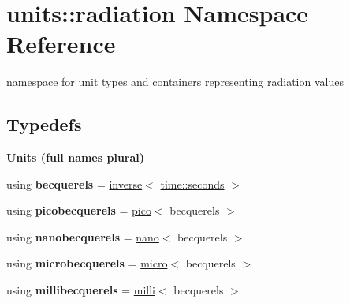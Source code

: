 \hypertarget{namespaceunits_1_1radiation}{}\section{units\+:\+:radiation Namespace Reference}
\label{namespaceunits_1_1radiation}


namespace for unit types and containers representing radiation values  


\subsection*{Typedefs}
\begin{Indent}{\bf Units (full names plural)}\par
\begin{DoxyCompactItemize}
\item 
\hypertarget{namespaceunits_1_1radiation_a44d3bfa167ecb4238de5bf0fad54bd69}{}using {\bfseries becquerels} = \hyperlink{group___unit_manipulators_gaacc539ef162e24b260d023d3ff949b57}{inverse}$<$ \hyperlink{structunits_1_1unit}{time\+::seconds} $>$\label{namespaceunits_1_1radiation_a44d3bfa167ecb4238de5bf0fad54bd69}

\item 
\hypertarget{namespaceunits_1_1radiation_a2d9ad4b0cf2cc17c4226cf0446104c0b}{}using {\bfseries picobecquerels} = \hyperlink{group___unit_manipulators_ga82a8d14a3e0877a375a66b64c45baab9}{pico}$<$ becquerels $>$\label{namespaceunits_1_1radiation_a2d9ad4b0cf2cc17c4226cf0446104c0b}

\item 
\hypertarget{namespaceunits_1_1radiation_a223740f0a2fec16ea89c6a9df7fb4144}{}using {\bfseries nanobecquerels} = \hyperlink{group___unit_manipulators_ga1c25c3c1d6c1f3aed3fd1ecf043110d5}{nano}$<$ becquerels $>$\label{namespaceunits_1_1radiation_a223740f0a2fec16ea89c6a9df7fb4144}

\item 
\hypertarget{namespaceunits_1_1radiation_aff42e6cfdc0d3f6c5e611e15f403f20a}{}using {\bfseries microbecquerels} = \hyperlink{group___unit_manipulators_gaea53c906ec805110b93f02db4a961971}{micro}$<$ becquerels $>$\label{namespaceunits_1_1radiation_aff42e6cfdc0d3f6c5e611e15f403f20a}

\item 
\hypertarget{namespaceunits_1_1radiation_a53771fbccf8337b092ef1167f4a28a7e}{}using {\bfseries millibecquerels} = \hyperlink{group___unit_manipulators_gaec9d1c320e180eb59f3cb3094d8079dd}{milli}$<$ becquerels $>$\label{namespaceunits_1_1radiation_a53771fbccf8337b092ef1167f4a28a7e}


\end{DoxyCompactItemize}
\end{Indent}
